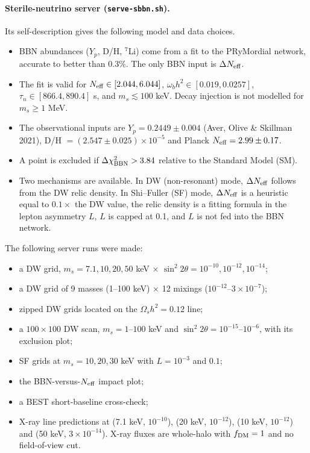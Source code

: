 \documentclass[11pt,a4paper]{article}
\begin{document}
\paragraph{Sterile-neutrino server (\texttt{serve-sbbn.sh}).} Its self-description gives the following model and data choices.
\begin{itemize}
\item BBN abundances ($Y_p$, D/H, $^7$Li) come from a fit to the PRyMordial network, accurate to better than 0.3\%. The only BBN input is $\Delta N_{\rm eff}$.
\item The fit is valid for $N_{\rm eff}\in[2.044,6.044]$, $\omega_b h^2\in[0.019,0.0257]$, $\tau_n\in[866.4,890.4]$ s, and $m_s\lesssim100$ keV. Decay injection is not modelled for $m_s\ge1$ MeV.
\item The observational inputs are $Y_p=0.2449\pm0.004$ (Aver, Olive \& Skillman 2021), D/H $=(2.547\pm0.025)\times10^{-5}$ and Planck $N_{\rm eff}=2.99\pm0.17$.
\item A point is excluded if $\Delta\chi^2_{\rm BBN}>3.84$ relative to the Standard Model (SM).
\item Two mechanisms are available. In DW (non-resonant) mode, $\Delta N_{\rm eff}$ follows from the DW relic density. In Shi--Fuller (SF) mode, $\Delta N_{\rm eff}$ is a heuristic equal to $0.1\times$ the DW value, the relic density is a fitting formula in the lepton asymmetry $L$, $L$ is capped at 0.1, and $L$ is not fed into the BBN network.
\end{itemize}

The following server runs were made:
\begin{itemize}
\item a DW grid, $m_s=7.1,10,20,50$ keV $\times$ $\sin^2 2\theta=10^{-10},10^{-12},10^{-14}$;
\item a DW grid of 9 masses (1--100 keV) $\times$ 12 mixings ($10^{-12}$--$3\times10^{-7}$);
\item zipped DW grids located on the $\Omega_s h^2=0.12$ line;
\item a $100\times100$ DW scan, $m_s=1$--$100$ keV and $\sin^2 2\theta=10^{-15}$--$10^{-6}$, with its exclusion plot;
\item SF grids at $m_s=10,20,30$ keV with $L=10^{-3}$ and $0.1$;
\item the BBN-versus-$N_{\rm eff}$ impact plot;
\item a BEST short-baseline cross-check;
\item X-ray line predictions at (7.1 keV, $10^{-10}$), (20 keV, $10^{-12}$), (10 keV, $10^{-12}$) and (50 keV, $3\times10^{-14}$). X-ray fluxes are whole-halo with $f_{\rm DM}=1$ and no field-of-view cut.
\end{itemize}
\end{document}
